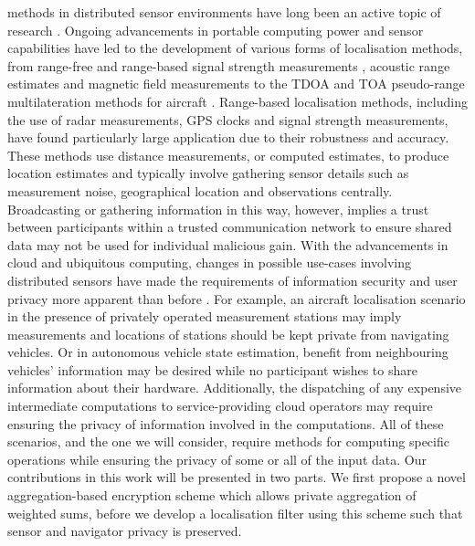 \documentclass[10pt,journal,compsoc]{IEEEtran}
\theoremstyle{definition}
\theoremstyle{definition}
\theoremstyle{remark}
\begin{document}
 methods in distributed sensor environments have long been an active topic of research \cite{pierceIntroductionLoran1946,liContributedReviewSourcelocalization2016}. Ongoing advancements in portable computing power and sensor capabilities have led to the development of various forms of localisation methods, from range-free and range-based signal strength measurements \cite{wangConvexCombinationSource2018,heRangeFreeLocalizationSchemes}, acoustic range estimates \cite{beutlerNewNonlinearFiltering2004} and magnetic field measurements \cite{sieblerLocalizationMagneticField2020} to the TDOA and TOA pseudo-range multilateration methods for aircraft \cite{liContributedReviewSourcelocalization2016}. Range-based localisation methods, including the use of radar measurements, GPS clocks and signal strength measurements, have found particularly large application due to their robustness and accuracy. These methods use distance measurements, or computed estimates, to produce location estimates and typically involve gathering sensor details such as measurement noise, geographical location and observations centrally. Broadcasting or gathering information in this way, however, implies a trust between participants within a trusted communication network to ensure shared data may not be used for individual malicious gain. With the advancements in cloud and ubiquitous computing, changes in possible use-cases involving distributed sensors have made the requirements of information security and user privacy more apparent than before \cite{brennerSecretProgramExecution2011,renSecurityChallengesPublic2012}. For example, an aircraft localisation scenario in the presence of privately operated measurement stations may imply measurements and locations of stations should be kept private from navigating vehicles. Or in autonomous vehicle state estimation, benefit from neighbouring vehicles' information may be desired while no participant wishes to share information about their hardware. Additionally, the dispatching of any expensive intermediate computations to service-providing cloud operators may require ensuring the privacy of information involved in the computations. All of these scenarios, and the one we will consider, require methods for computing specific operations while ensuring the privacy of some or all of the input data. Our contributions in this work will be presented in two parts. We first propose a novel aggregation-based encryption scheme which allows private aggregation of weighted sums, before we develop a localisation filter using this scheme such that sensor and navigator privacy is preserved.
\end{document}
